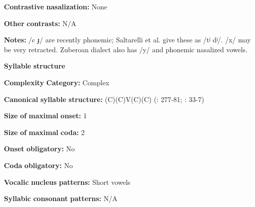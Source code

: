 \documentclass[output=paper]{langsci/langscibook}
\begin{document}
\begin{styleBody}
\textbf{Contrastive} \textbf{nasalization:} None
\end{styleBody}

\begin{styleBody}
\textbf{Other} \textbf{contrasts:} N/A
\end{styleBody}

\begin{styleBody}
\textbf{Notes:} /c ɟ/ are recently phonemic; Saltarelli et al. give these as /tʲ dʲ/. /x/ may be very retracted. Zuberoan dialect also has /y/ and phonemic nasalized vowels.
\end{styleBody}

\begin{styleBody}
\textbf{Syllable} \textbf{structure}
\end{styleBody}

\begin{styleBody}
\textbf{Complexity} \textbf{Category:} Complex
\end{styleBody}

\begin{styleBody}
\textbf{Canonical} \textbf{syllable} \textbf{structure:} (C)(C)V(C)(C) (\citealt{SaltarelliEtAl1988}: 277-81; \citealt{Hualde2003}: 33-7)
\end{styleBody}

\begin{styleBody}
\textbf{Size} \textbf{of} \textbf{maximal} \textbf{onset:} 1
\end{styleBody}

\begin{styleBody}
\textbf{Size} \textbf{of} \textbf{maximal} \textbf{coda:} 2
\end{styleBody}

\begin{styleBody}
\textbf{Onset} \textbf{obligatory:} No
\end{styleBody}

\begin{styleBody}
\textbf{Coda} \textbf{obligatory:} No
\end{styleBody}

\begin{styleBody}
\textbf{Vocalic} \textbf{nucleus} \textbf{patterns:} Short vowels
\end{styleBody}

\begin{styleBody}
\textbf{Syllabic} \textbf{consonant} \textbf{patterns:} N/A
\end{styleBody}
\end{document}
